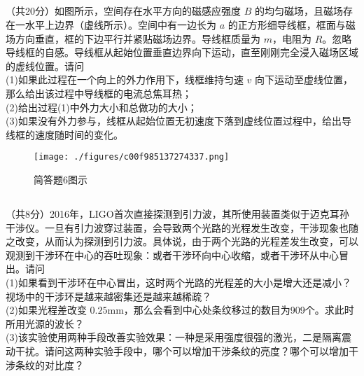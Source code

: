 \subsection{ }
（共20分）如图所示，空间存在水平方向的磁感应强度 $B$ 的均匀磁场，且磁场存在一水平上边界（虚线所示）。空间中有一边长为 $a$ 的正方形细导线框，框面与磁场方向垂直，框的下边平行并紧贴磁场边界。导线框质量为 $m$，电阻为 $R$。忽略导线框的自感。导线框从起始位置垂直边界向下运动，直至刚刚完全浸入磁场区域的虚线位置。请问\\
(1)如果此过程在一个向上的外力作用下，线框维持匀速 $v$ 向下运动至虚线位置，那么给出该过程中导线框的电流总焦耳热；\\
(2)给出过程(1)中外力大小和总做功的大小；\\
(3)如果没有外力参与，线框从起始位置无初速度下落到虚线位置过程中，给出导线框的速度随时间的变化。\\
\begin{figure}[ht]
\centering
\texttt{[image: ./figures/c00f985137274337.png]}
\caption{简答题6图示} \label{fig_CAS17_6}
\end{figure}

\subsection{ }
（共8分）2016年，LIGO首次直接探测到引力波，其所使用装置类似于迈克耳孙干涉仪。一旦有引力波穿过装置，会导致两个光路的光程发生改变，干涉现象也随之改变，从而认为探测到引力波。具体说，由于两个光路的光程差发生改变，可以观测到干涉环在中心的吞吐现象：或者干涉环向中心收缩，或者干涉环从中心冒出。请问\\
(1)如果看到干涉环在中心冒出，这时两个光路的光程差的大小是增大还是减小？视场中的干涉环是越来越密集还是越来越稀疏？\\
(2)如果光程差改变 $0.25\mathrm{mm}$，那么会看到中心处条纹移过的数目为909个。求此时所用光源的波长？\\
(3)该实验使用两种手段改善实验效果：一种是采用强度很强的激光，二是隔离震动干扰。请问这两种实验手段中，哪个可以增加干涉条纹的亮度？哪个可以增加干涉条纹的对比度？